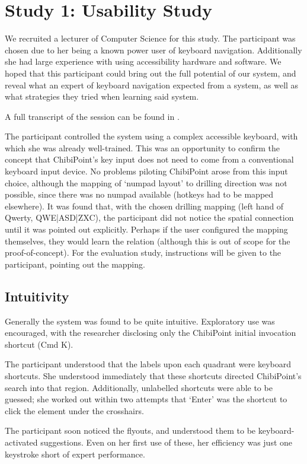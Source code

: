 \documentclass[a4paper, 12pt]{report}
\begin{document}
\section{Study 1: Usability Study}
We recruited a lecturer of Computer Science for this study. The participant was chosen due to her being a known power user of keyboard navigation. Additionally she had large experience with using accessibility hardware and software. We hoped that this participant could bring out the full potential of our system, and reveal what an expert of keyboard navigation expected from a system, as well as what strategies they tried when learning said system.

A full transcript of the session can be found in .

The participant controlled the system using a complex accessible keyboard, with which she was already well-trained. This was an opportunity to confirm the concept that ChibiPoint's key input does not need to come from a conventional keyboard input device. No problems piloting ChibiPoint arose from this input choice, although the mapping of `numpad layout' to drilling direction was not possible, since there was no numpad available (hotkeys had to be mapped elsewhere). It was found that, with the chosen drilling mapping (left hand of Qwerty, QWE|ASD|ZXC), the participant did not notice the spatial connection until it was pointed out explicitly. Perhaps if the user configured the mapping themselves, they would learn the relation (although this is out of scope for the proof-of-concept). For the evaluation study, instructions will be given to the participant, pointing out the mapping.

\subsection{Intuitivity}
Generally the system was found to be quite intuitive. Exploratory use was encouraged, with the researcher disclosing only the ChibiPoint initial invocation shortcut (Cmd K).

The participant understood that the labels upon each quadrant were keyboard shortcuts. She understood immediately that these shortcuts directed ChibiPoint's search into that region. Additionally, unlabelled shortcuts were able to be guessed; she worked out within two attempts that `Enter' was the shortcut to click the element under the crosshairs.

The participant soon noticed the flyouts, and understood them to be keyboard-activated suggestions. Even on her first use of these, her efficiency was just one keystroke short of expert performance.
\end{document}

